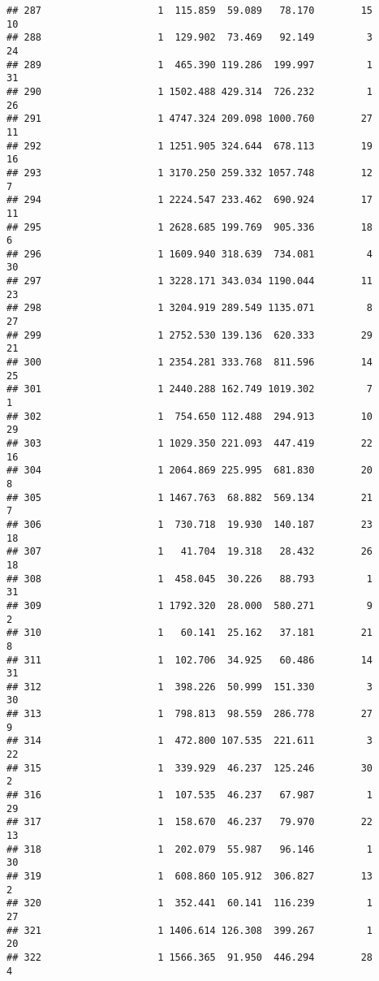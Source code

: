 \documentclass[
]{article}
\begin{document}
\begin{verbatim}
## 287                    1  115.859  59.089   78.170        15        10
## 288                    1  129.902  73.469   92.149         3        24
## 289                    1  465.390 119.286  199.997         1        31
## 290                    1 1502.488 429.314  726.232         1        26
## 291                    1 4747.324 209.098 1000.760        27        11
## 292                    1 1251.905 324.644  678.113        19        16
## 293                    1 3170.250 259.332 1057.748        12         7
## 294                    1 2224.547 233.462  690.924        17        11
## 295                    1 2628.685 199.769  905.336        18         6
## 296                    1 1609.940 318.639  734.081         4        30
## 297                    1 3228.171 343.034 1190.044        11        23
## 298                    1 3204.919 289.549 1135.071         8        27
## 299                    1 2752.530 139.136  620.333        29        21
## 300                    1 2354.281 333.768  811.596        14        25
## 301                    1 2440.288 162.749 1019.302         7         1
## 302                    1  754.650 112.488  294.913        10        29
## 303                    1 1029.350 221.093  447.419        22        16
## 304                    1 2064.869 225.995  681.830        20         8
## 305                    1 1467.763  68.882  569.134        21         7
## 306                    1  730.718  19.930  140.187        23        18
## 307                    1   41.704  19.318   28.432        26        18
## 308                    1  458.045  30.226   88.793         1        31
## 309                    1 1792.320  28.000  580.271         9         2
## 310                    1   60.141  25.162   37.181        21         8
## 311                    1  102.706  34.925   60.486        14        31
## 312                    1  398.226  50.999  151.330         3        30
## 313                    1  798.813  98.559  286.778        27         9
## 314                    1  472.800 107.535  221.611         3        22
## 315                    1  339.929  46.237  125.246        30         2
## 316                    1  107.535  46.237   67.987         1        29
## 317                    1  158.670  46.237   79.970        22        13
## 318                    1  202.079  55.987   96.146         1        30
## 319                    1  608.860 105.912  306.827        13         2
## 320                    1  352.441  60.141  116.239         1        27
## 321                    1 1406.614 126.308  399.267         1        20
## 322                    1 1566.365  91.950  446.294        28         4

\end{verbatim}
\end{document}
